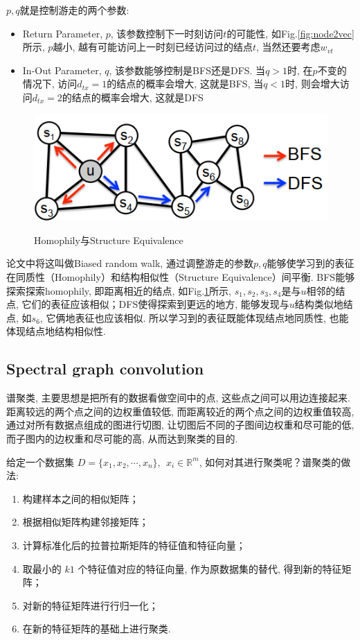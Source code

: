 $p, q$就是控制游走的两个参数: 
\begin{itemize}
	\item Return Parameter, $p$, 该参数控制下一时刻访问$t$的可能性, 如Fig.\ref{fig:node2vec}所示, $p$越小, 越有可能访问上一时刻已经访问过的结点$t$, 当然还要考虑$w_{vt}$
	\item In-Out Parameter, $q$, 该参数能够控制是BFS还是DFS. 当$q>1$时, 在$p$不变的情况下, 访问$d_{tx} = 1$的结点的概率会增大, 这就是BFS, 当$q<1$时, 则会增大访问$d_{tx} = 2$的结点的概率会增大, 这就是DFS
\end{itemize}
\begin{figure}[h]
	\centering
	\includegraphics[width=.8\textwidth]{pics/node2vec2.png}
	\label{fig:node2vec2}
	\caption{Homophily与Structure Equivalence}
\end{figure}

论文中将这叫做Biased random walk, 通过调整游走的参数$p,q$能够使学习到的表征在同质性（Homophily）和结构相似性（Structure Equivalence）间平衡. BFS能够探索探索homophily, 即距离相近的结点, 如Fig.\ref{fig:node2vec2}所示, $s_1, s_2, s_3, s_4$是与$u$相邻的结点, 它们的表征应该相似；DFS使得探索到更远的地方, 能够发现与$u$结构类似地结点, 如$s_6$, 它俩地表征也应该相似. 所以学习到的表征既能体现结点地同质性, 也能体现结点地结构相似性. 

\subsection{Spectral graph convolution}
谱聚类, 主要思想是把所有的数据看做空间中的点, 这些点之间可以用边连接起来. 距离较远的两个点之间的边权重值较低, 而距离较近的两个点之间的边权重值较高, 通过对所有数据点组成的图进行切图, 让切图后不同的子图间边权重和尽可能的低, 而子图内的边权重和尽可能的高, 从而达到聚类的目的. 

给定一个数据集 $D = \{x_1, x_2, \cdots, x_n\},\ \ x_i \in \mathbb{R}^m$, 如何对其进行聚类呢？谱聚类的做法: 
\begin{enumerate}
	\item 构建样本之间的相似矩阵；
	\item 根据相似矩阵构建邻接矩阵；
	\item 计算标准化后的拉普拉斯矩阵的特征值和特征向量；
	\item 取最小的 $k1$ 个特征值对应的特征向量, 作为原数据集的替代, 得到新的特征矩阵；
	\item 对新的特征矩阵进行行归一化；
	\item 在新的特征矩阵的基础上进行聚类. 
\end{enumerate}